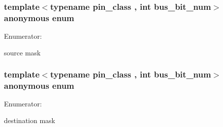 \hypertarget{structavrpp_1_1bus_1_1bus__pin_a2e4306bf231d90eb5a7a929099c611f2}{
\subsubsection[{"@3}]{\setlength{\rightskip}{0pt plus 5cm}template$<$typename pin\_\-class , int bus\_\-bit\_\-num$>$ anonymous enum}}
\label{structavrpp_1_1bus_1_1bus__pin_a2e4306bf231d90eb5a7a929099c611f2}
\begin{Desc}
\item[Enumerator: ]\par
\begin{description}
\item[{\em 
\hypertarget{structavrpp_1_1bus_1_1bus__pin_a2e4306bf231d90eb5a7a929099c611f2a84086ca50cd436bf19887f0216325155}{
src\_\-mask}
\label{structavrpp_1_1bus_1_1bus__pin_a2e4306bf231d90eb5a7a929099c611f2a84086ca50cd436bf19887f0216325155}
}]source mask \end{description}
\end{Desc}

\hypertarget{structavrpp_1_1bus_1_1bus__pin_a7487f124c2cb751c596f6f5e6e613cc8}{
\subsubsection[{"@4}]{\setlength{\rightskip}{0pt plus 5cm}template$<$typename pin\_\-class , int bus\_\-bit\_\-num$>$ anonymous enum}}
\label{structavrpp_1_1bus_1_1bus__pin_a7487f124c2cb751c596f6f5e6e613cc8}
\begin{Desc}
\item[Enumerator: ]\par
\begin{description}
\item[{\em 
\hypertarget{structavrpp_1_1bus_1_1bus__pin_a7487f124c2cb751c596f6f5e6e613cc8adb46758cdedccfdda226339b608bcede}{
dst\_\-mask}
\label{structavrpp_1_1bus_1_1bus__pin_a7487f124c2cb751c596f6f5e6e613cc8adb46758cdedccfdda226339b608bcede}
}]destination mask \end{description}
\end{Desc}

